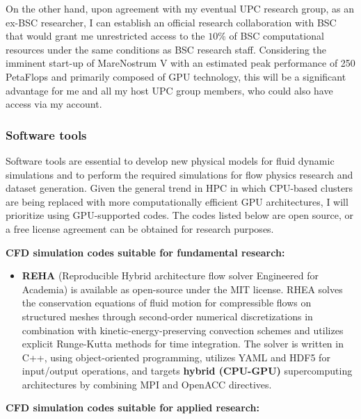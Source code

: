 \documentclass{article}
\begin{document}
On the other hand, upon agreement with my eventual UPC research group, as an ex-BSC researcher, I can establish an official research collaboration with BSC that would grant me unrestricted access to the $10\%$ of BSC computational resources under the same conditions as BSC research staff. Considering the imminent start-up of MareNostrum V with an estimated peak performance of 250 PetaFlops and primarily composed of GPU technology, this will be a significant advantage for me and all my host UPC group members, who could also have access via my account.

\subsubsection{Software tools}

Software tools are essential to develop new physical models for fluid dynamic simulations and to perform the required simulations for flow physics research and dataset generation. Given the general trend in HPC in which CPU-based clusters are being replaced with more computationally efficient GPU architectures, I will prioritize using GPU-supported codes. The codes listed below are open source, or a free license agreement can be obtained for research purposes.

{\bf CFD simulation codes suitable for fundamental research:}

\begin{itemize}
\item {\bf REHA} (Reproducible Hybrid architecture flow solver Engineered for Academia) \cite{JOF23} is available as open-source under the MIT license. RHEA solves the conservation equations of fluid motion for compressible flows on structured meshes through second-order numerical discretizations in combination with kinetic-energy-preserving convection schemes and utilizes explicit Runge-Kutta methods for time integration. The solver is written in C++, using object-oriented programming, utilizes YAML and HDF5 for input/output operations, and targets {\bf hybrid (CPU-GPU)} supercomputing architectures by combining MPI and OpenACC directives.
\end{itemize}

{\bf CFD simulation codes suitable for applied research:}
\end{document}
